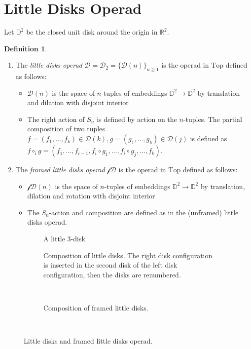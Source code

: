 \documentclass{scrartcl}
\theoremstyle{plain}
\theoremstyle{definition}
\newtheorem{definition}[theorem]{Definition}
\newcommand{\R}{\mathbb{R}}
\newcommand{\comp}{\circ}
\begin{document}
\section{Little Disks Operad}
Let $\mathds D^2$ be the closed unit disk around the origin in $\R^2$.
\begin{definition}
    \begin{enumerate}[(1)]
    \item
    The \emph{little disks operad} $\mathcal D = \mathcal D_2 = {\{\mathcal D(n)\}}_{n\geq 1}$ is the operad in $\mathrm{Top}$ defined as follows:
    \begin{itemize}
        \item $\mathcal D(n)$ is the space of $n$-tuples of embeddings $\mathds D^2 \to \mathds D^2$ by translation and dilation with disjoint interior
        \item The right action of $S_n$ is defined by action on the $n$-tuples. The partial composition of two tuples $f = (f_1, \dots, f_k)\in\mathcal D(k), g = (g_1, \dots, g_k)\in\mathcal D(j)$ is defined as $f\comp_i g = (f_1, \dots, f_{i-1}, f_i \comp g_1, \dots, f_i \comp g_j, \dots, f_k)$.
    \end{itemize}
    \item The \emph{framed little disks operad} $\mathcal{fD}$ is the operad in $\mathrm{Top}$ defined as follows:
    \begin{itemize}
        \item $\mathcal {fD}(n)$ is the space of $n$-tuples of embeddings $\mathds D^2 \to \mathds D^2$ by translation, dilation and rotation with disjoint interior
        \item The $S_n$-action and composition are defined as in the (unframed) little disks operad.
    \end{itemize}
\end{enumerate}
\end{definition}

\begin{figure}[ht]
    \centering
    \begin{subfigure}[b]{0.2\textwidth}
        \centering
        
        \caption{A little $3$-disk}
    \end{subfigure}
    \hfill
    \begin{subfigure}[b]{0.7\textwidth}
        \centering
        
        \caption{Composition of little disks. The right disk configuration is inserted in the second disk of the left disk configuration, then the disks are renumbered. }
    \end{subfigure} \\[5mm]
    \begin{subfigure}[b]{0.7\textwidth}
        \centering
        
        \caption{Composition of framed little disks. }
    \end{subfigure} \\
    \caption{Little disks and framed little disks operad. }\label{little_disks}
\end{figure}
\end{document}

